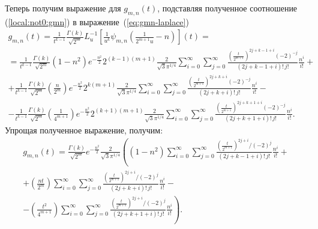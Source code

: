 \documentclass[../paper.tex]{subfiles}
\begin{document}
Теперь получим выражение для $g_{m,n}(t)$, подставляя полученное соотношение (\ref{local:not0:gmn}) в выражение~(\ref{eq:gmn-laplace})
\begin{multline*}
    g_{m,n}(t) = 
    \frac{1}{t^{k-1}} \frac{\Gamma(k)}{\sqrt{2^m}} L^{-1}_u \left[ \frac{1}{u^k} \psi_{m,n} \left( \frac{1}{2^{m+1} u} - n \right) \right] (t)
=\\=
    \frac{1}{t^{k-1}} \frac{\Gamma(k)}{\sqrt{2^m}} \left( 1-n^2 \right) 
    e^{-\frac{n^2}{2}} 2^{(k-1)(m+1)} \frac{2}{\sqrt{3} \pi^{1/4}}
    \sum_{i=0}^{\infty} \sum_{j=0}^{\infty} \frac{\left( \frac{t}{2^{m+1}} \right) ^{2j+k-1+i} (-2)^{-j}}{(2j+k-1+i)!\,j!} \frac{n^i}{i!}
+\\+
    \frac{1}{t^{k-1}} \frac{\Gamma(k)}{\sqrt{2^m}} \left( \frac{n}{2^m} \right) 
    e^{-\frac{n^2}{2}} 2^{k(m+1)} \frac{2}{\sqrt{3} \pi^{1/4}}
    \sum_{i=0}^{\infty} \sum_{j=0}^{\infty} \frac{\left( \frac{t}{2^{m+1}} \right) ^{2j+k+i} (-2)^{-j}}{(2j+k+i)!\,j!} \frac{n^i}{i!}
-\\-
    \frac{1}{t^{k-1}} \frac{\Gamma(k)}{\sqrt{2^m}} \left( \frac{1}{4^{m+1}} \right) 
    e^{-\frac{n^2}{2}} 2^{(k+1)(m+1)} \frac{2}{\sqrt{3} \pi^{1/4}}
    \sum_{i=0}^{\infty} \sum_{j=0}^{\infty} \frac{\left( \frac{t}{2^{m+1}} \right) ^{2j+k+1+i} (-2)^{-j}}{(2j+k+1+i)!\,j!} \frac{n^i}{i!}
.\end{multline*}
Упрощая полученное выражение, получим:
\begin{multline*}
    g_{m,n}(t)
=
    \frac{\Gamma(k)}{\sqrt{2^m}} e^{-\frac{n^2}{2}} \frac{2}{\sqrt{3} \pi^{1/4}} \left(
    \left( 1-n^2 \right) 
    \sum_{i=0}^{\infty} \sum_{j=0}^{\infty} \frac{\left( \frac{t}{2^{m+1}} \right) ^{2j+i} / (-2)^j}{(2j+k-1+i)!\,j!} \frac{n^i}{i!} \right.
+\\+
    \left( \frac{nt}{2^m} \right) 
    \sum_{i=0}^{\infty} \sum_{j=0}^{\infty} \frac{\left( \frac{t}{2^{m+1}} \right) ^{2j+i} / (-2)^j}{(2j+k+i)!\,j!} \frac{n^i}{i!}
-\\- \left.
    \left( \frac{t^2}{4^{m+1}} \right) 
    \sum_{i=0}^{\infty} \sum_{j=0}^{\infty} \frac{\left( \frac{t}{2^{m+1}} \right) ^{2j+i} / (-2)^j}{(2j+k+1+i)!\,j!} \frac{n^i}{i!}
    \right)
.\end{multline*}
\end{document}
